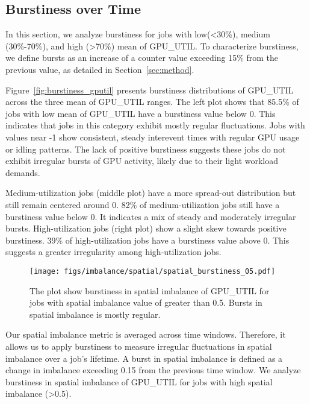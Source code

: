 \subsection{Burstiness over Time}

In this section, we analyze burstiness for jobs with
low(\textless30\%), medium (30\%-70\%), and high (\textgreater70\%) mean of
GPU\_UTIL. To characterize burstiness, we define bursts as an
increase of a counter value exceeding 15\% from the previous value,
as detailed in Section~\ref{sec:method}.

Figure~\ref{fig:burstiness_gputil} presents burstiness distributions of GPU\_UTIL
across the three mean of GPU\_UTIL ranges. The left plot shows that
85.5\% of jobs with low mean of GPU\_UTIL have a burstiness value below 0. This
indicates that jobs in this category exhibit mostly regular fluctuations.
Jobs with values near -1 show consistent, steady interevent times with regular
GPU usage or idling patterns. The lack of positive burstiness
suggests these jobs do not exhibit irregular bursts of GPU activity, likely due to
their light workload demands.

Medium-utilization jobs (middle plot) have a more spread-out
distribution but still remain centered around 0. 82\% of medium-utilization
jobs still have a burstiness value below 0. It indicates a mix of steady and
moderately irregular bursts. High-utilization jobs (right plot) show a slight
skew towards positive burstiness. 39\% of high-utilization jobs have a burstiness
value above 0. This suggests a greater irregularity among high-utilization jobs.

\begin{figure}[h]
    \centering
    \texttt{[image: figs/imbalance/spatial/spatial\_burstiness\_05.pdf]}
    \caption{
        The plot show burstiness in spatial imbalance of GPU\_UTIL for jobs with
        spatial imbalance value of greater than 0.5. Bursts in spatial imbalance
        is mostly regular.}
    \label{fig:spatial_burstiness}
\end{figure}

Our spatial imbalance metric is averaged across time windows. Therefore, it
allows us to apply burstiness to measure irregular fluctuations in spatial
imbalance over a job's lifetime. A burst in spatial imbalance is defined as
a change in imbalance exceeding 0.15 from the previous time window. We analyze
burstiness in spatial imbalance of GPU\_UTIL for jobs with high spatial
imbalance (\textgreater0.5).

